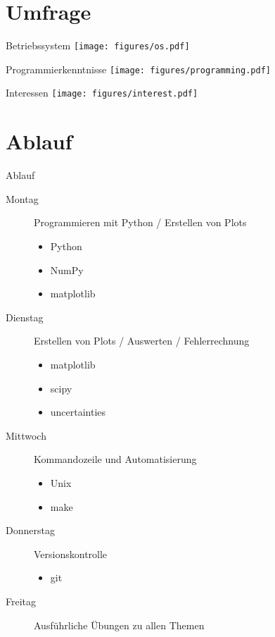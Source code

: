 \section{Umfrage}


\begin{frame}{Betriebssystem}
  \centering
  \texttt{[image: figures/os.pdf]}
\end{frame}

\begin{frame}{Programmierkenntnisse}
  \centering
  \texttt{[image: figures/programming.pdf]}
\end{frame}

\begin{frame}{Interessen}
  \centering
  \texttt{[image: figures/interest.pdf]}
\end{frame}

\section{Ablauf}

\begin{frame}{Ablauf}
  \begin{description}
    \item[Montag] Programmieren mit Python / Erstellen von Plots
      \begin{itemize}
        \item Python
        \item NumPy
        \item matplotlib
      \end{itemize}
    \item[Dienstag] Erstellen von Plots / Auswerten / Fehlerrechnung
      \begin{itemize}
        \item matplotlib
        \item scipy
        \item uncertainties
      \end{itemize}
    \item[Mittwoch] Kommandozeile und Automatisierung
      \begin{itemize}
        \item Unix
        \item make
      \end{itemize}
    \item[Donnerstag] Versionskontrolle
      \begin{itemize}
        \item git
      \end{itemize}
    \item[Freitag] Ausführliche Übungen zu allen Themen
  \end{description}
\end{frame}

